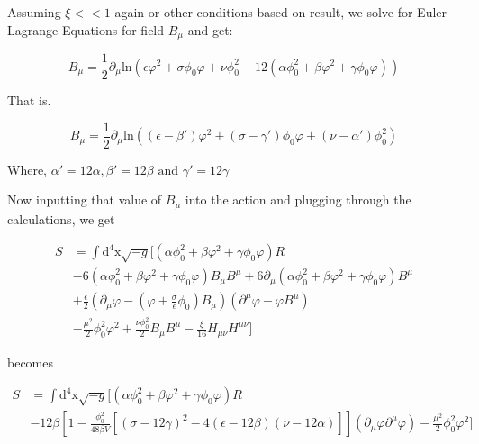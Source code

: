 \documentclass{article}
\begin{document}
Assuming $\xi << 1$ again or other conditions based on result, we solve for Euler-Lagrange Equations for field $B_\mu$ and get:

\begin{equation}
    B_\mu = \frac{1}{2} \partial_\mu \text{ln}(\epsilon \varphi^2 + \sigma \phi_0 \varphi + \nu \phi^2_0 -12 (\alpha \phi^2_0 + \beta \varphi^2 + \gamma \phi_0 \varphi))
\end{equation}

That is.

\begin{equation}
    B_\mu = \frac{1}{2} \partial_\mu \text{ln}((\epsilon - \beta') \varphi^2 + (\sigma - \gamma') \phi_0 \varphi + (\nu - \alpha')\phi^2_0)
\end{equation}

Where, $\alpha' = 12\alpha, \beta' = 12\beta \text{ and } \gamma' = 12 \gamma$

Now inputting that value of $B_\mu$ into the action and plugging through the calculations, we get

\begin{equation}
    \begin{aligned}
        S &= \int \text{d}^4\text{x} \sqrt{-g} [ (\alpha \phi^2_0 + \beta \varphi^2 + \gamma \phi_0 \varphi) R \\
          & - 6 (\alpha \phi^2_0 + \beta \varphi^2 + \gamma \phi_0 \varphi)B_{\mu} B^{\mu} + 6\partial_\mu (\alpha \phi^2_0 + \beta \varphi^2 + \gamma \phi_0 \varphi)B^\mu \\
        &+ \frac{\epsilon}{2} (\partial_\mu \varphi - (\varphi + \frac{\sigma}{\epsilon} \phi_0)B_\mu)(\partial^\mu \varphi - \varphi B^\mu)\\
        &- \frac{\mu^2}{2} \phi^2_0 \varphi^2 + \frac{\nu \phi_{0}^{2}}{2} B_\mu B^\mu - \frac{\xi}{16} H_{\mu\nu}H^{\mu\nu} ] 
    \end{aligned}
\end{equation}

becomes

\begin{equation} \label{24}
    \begin{aligned}
        S &= \int \text{d}^4\text{x} \sqrt{-g} [ (\alpha \phi^2_0 + \beta \varphi^2 + \gamma \phi_0 \varphi) R \\
        &- 12 \beta \left[ 1 - \frac{\phi_0^2}{48\beta V} [(\sigma - 12\gamma)^2 - 4(\epsilon - 12 \beta)(\nu - 12\alpha) ] \right] (\partial_\mu \varphi \partial^\mu \varphi)- \frac{\mu^2}{2} \phi^2_0 \varphi^2 ] 
    \end{aligned}
\end{equation}
\end{document}
